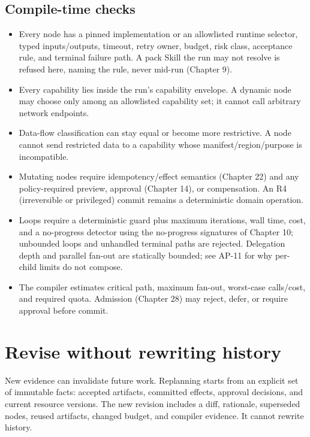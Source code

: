 \subsection{Compile-time checks}

\begin{itemize}

\item Every node has a pinned implementation or an allowlisted runtime selector, typed inputs/outputs, timeout, retry owner, budget, risk class, acceptance rule, and terminal failure path. A pack Skill the run may not resolve is refused here, naming the rule, never mid-run (Chapter 9).

\item Every capability lies inside the run's capability envelope. A dynamic node may choose only among an allowlisted capability set; it cannot call arbitrary network endpoints.

\item Data-flow classification can stay equal or become more restrictive. A node cannot send restricted data to a capability whose manifest/region/purpose is incompatible.

\item Mutating nodes require idempotency/effect semantics (Chapter 22) and any policy-required preview, approval (Chapter 14), or compensation. An R4 (irreversible or privileged) commit remains a deterministic domain operation.

\item Loops require a deterministic guard plus maximum iterations, wall time, cost, and a no-progress detector using the no-progress signatures of Chapter 10; unbounded loops and unhandled terminal paths are rejected. Delegation depth and parallel fan-out are statically bounded; see AP-11 for why per-child limits do not compose.

\item The compiler estimates critical path, maximum fan-out, worst-case calls/cost, and required quota. Admission (Chapter 28) may reject, defer, or require approval before commit.

\end{itemize}

\section{Revise without rewriting history}

New evidence can invalidate future work. Replanning starts from an explicit set of immutable facts: accepted artifacts, committed effects, approval decisions, and current resource versions. The new revision includes a diff, rationale, superseded nodes, reused artifacts, changed budget, and compiler evidence. It cannot rewrite history.\par

